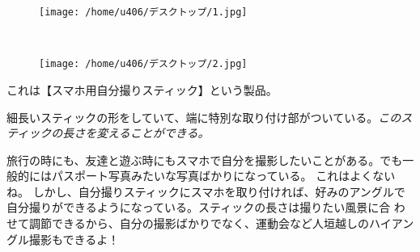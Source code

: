 \documentclass[10pt]{book}
\begin{document}
\begin{figure}[H]
        \centering
        \begin{subfloat}{}
                {\texttt{[image: /home/u406/デスクトップ/1.jpg]}}
        \end{subfloat}~
        \begin{subfloat}{}
                {\texttt{[image: /home/u406/デスクトップ/2.jpg]}}
        \end{subfloat}
\end{figure}\vspace{1in}
これは【スマホ用自分撮りスティック】という製品。\\\newline

細長いスティックの形をしていて、端に特別な取り付け部がついている。{\it このスティックの長さを変えることができる。}\\\newline

旅行の時にも、友達と遊ぶ時にもスマホで自分を撮影したいことがある。でも一般的にはパスポート写真みたいな写真ばかりになっている。
これはよくないね。
しかし、自分撮りスティックにスマホを取り付ければ、好みのアングルで自分撮りができるようになっている。スティックの長さは撮りたい風景に合
わせて調節できるから、自分の撮影ばかりでなく、運動会など人垣越しのハイアングル撮影もできるよ！
\end{document}
